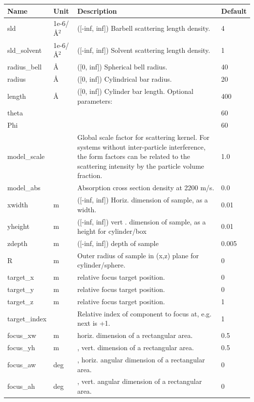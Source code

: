 \begin{longtable}{p{}p{}p{}p{}}
\toprule
\textbf{Name} & \textbf{Unit} & \textbf{Description} & \textbf{Default} \\
\midrule
\endhead
sld & 1e-6/\AA{}$^{2}$ & ([-inf, inf]) Barbell scattering length density. & 4 \\
sld\_solvent & 1e-6/\AA{}$^{2}$ & ([-inf, inf]) Solvent scattering length density. & 1 \\
radius\_bell & \AA{} & ([0, inf]) Spherical bell radius. & 40 \\
radius & \AA{} & ([0, inf]) Cylindrical bar radius. & 20 \\
length & \AA{} & ([0, inf]) Cylinder bar length. Optional parameters: & 400 \\
theta &  &  & 60 \\
Phi &  &  & 60 \\
model\_scale &   & Global scale factor for scattering kernel. For systems without inter-particle interference, the form factors can be related to the scattering intensity by the particle volume fraction. & 1.0 \\
model\_abs &   & Absorption cross section density at 2200 m/s. & 0.0 \\
xwidth & m & ([-inf, inf]) Horiz. dimension of sample, as a width. & 0.01 \\
yheight & m & ([-inf, inf]) vert . dimension of sample, as a height for cylinder/box & 0.01 \\
zdepth & m & ([-inf, inf]) depth of sample & 0.005 \\
R & m & Outer radius of sample in (x,z) plane for cylinder/sphere. & 0 \\
target\_x & m & relative focus target position. & 0 \\
target\_y & m & relative focus target position. & 0 \\
target\_z & m & relative focus target position. & 1 \\
target\_index &   & Relative index of component to focus at, e.g. next is +1. & 1 \\
focus\_xw & m & horiz. dimension of a rectangular area. & 0.5 \\
focus\_yh & m & , vert. dimension of a rectangular area. & 0.5 \\
focus\_aw & deg & , horiz. angular dimension of a rectangular area. & 0 \\
focus\_ah & deg & , vert. angular dimension of a rectangular area. & 0 \\

\end{longtable}

